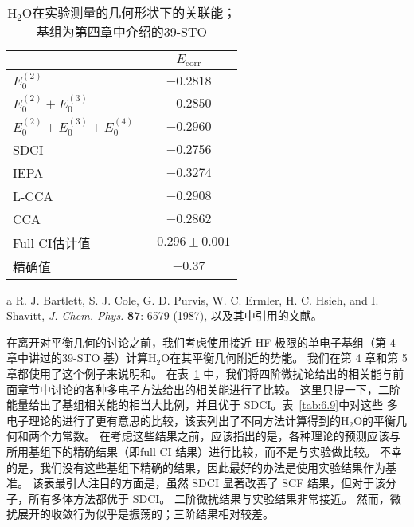 \begin{table}
	\centering
	\caption{$\mathrm{H_2O}$在实验测量的几何形状下的关联能；基组为第四章中介绍的39-STO}
	\begin{threeparttable}
		\begin{tabular}{l@{\hspace{2.5cm}}c}
			\hline & \multicolumn{1}{c}{$E_{\text {corr}}$} \\
			\hline$E_0^{(2)}$ & $-0.2818$ \\
			$E_0^{(2)}+E_0^{(3)}$ & $-0.2850$ \\
			$E_0^{(2)}+E_0^{(3)}+E_0^{(4)}$ & $-0.2960$ \\
			SDCI & $-0.2756$ \\
			IEPA & $-0.3274$ \\
			L-CCA & $-0.2908$ \\
			CCA & $-0.2862$ \\
			Full CI估计值 & $-0.296 \pm 0.001$ \\
			精确值 & $-0.37$ \\
			\hline
		\end{tabular}
	\begin{tablenotes}
		\item[a] R. J. Bartlett, S. J. Cole, G. D. Purvis, W. C. Ermler, H. C. Hsieh, and I. Shavitt, \textit{J. Chem. Phys.} \textbf{87}: 6579 (1987), 以及其中引用的文献。
	\end{tablenotes}
	\end{threeparttable}
	\label{tab:6.8}
\end{table}

在离开对平衡几何的讨论之前，我们考虑使用接近 HF 极限的单电子基组（第 4 章中讲过的39-STO 基）计算$\mathrm{H_2O}$在其平衡几何附近的势能。 我们在第 4 章和第 5 章都使用了这个例子来说明和。 在表~\ref{tab:6.8} 中，我们将四阶微扰论给出的相关能与前面章节中讨论的各种多电子方法给出的相关能进行了比较。 这里只提一下，二阶能量给出了基组相关能的相当大比例，并且优于 SDCI。表~\ref{tab:6.9}中对这些
多电子理论的进行了更有意思的比较，该表列出了不同方法计算得到的$\mathrm{H_2O}$的平衡几何和两个力常数。 在考虑这些结果之前，应该指出的是，各种理论的预测应该与所用基组下的精确结果（即full CI 结果）进行比较，而不是与实验做比较。 不幸的是，我们没有这些基组下精确的结果，因此最好的办法是使用实验结果作为基准。 该表最引人注目的方面是，虽然 SDCI 显著改善了 SCF 结果，但对于该分子，所有多体方法都优于 SDCI。 二阶微扰结果与实验结果非常接近。 然而，微扰展开的收敛行为似乎是振荡的；三阶结果相对较差。

